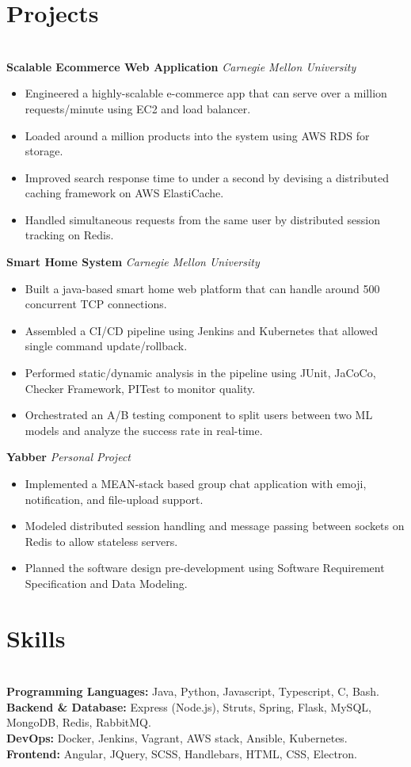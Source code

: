 \documentclass{resume}
\begin{document}
\section*{Projects}
\titlerule
\noindent
\\
\textbf{Scalable Ecommerce Web Application} \hfill \textit{Carnegie Mellon University}
\begin{itemize}
  \item Engineered a highly-scalable e-commerce app that can serve over a million requests/minute using EC2 and load balancer.
  \item Loaded around a million products into the system using AWS RDS for storage.
  \item Improved search response time to under a second by devising a distributed caching framework on AWS ElastiCache.
  \item Handled simultaneous requests from the same user by distributed session tracking on Redis.
\end{itemize}
\textbf{Smart Home System} \hfill \textit{Carnegie Mellon University}
\begin{itemize}
  \item Built a java-based smart home web platform that can handle around 500 concurrent TCP connections.
  \item Assembled a CI/CD pipeline using Jenkins and Kubernetes that allowed single command update/rollback.
  \item Performed static/dynamic analysis in the pipeline using JUnit, JaCoCo, Checker Framework, PITest to monitor quality.
  \item Orchestrated an A/B testing component to split users between two ML models and analyze the success rate in real-time.
\end{itemize}
\textbf{Yabber} \hfill \textit{Personal Project}
\begin{itemize}
  \item Implemented a MEAN-stack based group chat application with emoji, notification, and file-upload support.
  \item Modeled distributed session handling and message passing between sockets on Redis to allow stateless servers.
  \item Planned the software design pre-development using Software Requirement Specification and Data Modeling.
\end{itemize}
\section*{Skills}
\titlerule
\noindent
\\
\textbf{Programming Languages:} Java, Python, Javascript, Typescript, C, Bash. \\
\textbf{Backend \& Database:} Express (Node.js), Struts, Spring, Flask, MySQL, MongoDB, Redis, RabbitMQ. \\
\textbf{DevOps:} Docker, Jenkins, Vagrant, AWS stack, Ansible, Kubernetes. \\
\textbf{Frontend:} Angular, JQuery, SCSS, Handlebars, HTML, CSS, Electron.
\end{document}
